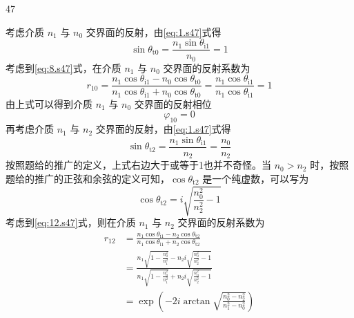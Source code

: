 \begin{solution}{47}
\begin{subsolution}
        考虑介质 $n_{1}$ 与 $n_{0}$ 交界面的反射，由\eqref{eq:1.s47}式得
        \begin{equation}
            \sin\theta_{\mathrm{t}0} = \frac{n_{1}\sin\theta_{\mathrm{i}1}}{n_{0}} = 1
            \label{eq:8.s47}
        \end{equation}
        考虑到\eqref{eq:8.s47}式，在介质 $n_{1}$ 与 $n_{0}$ 交界面的反射系数为
        \begin{equation}
            r_{10} = \frac{n_{1}\cos\theta_{\mathrm{i}1} - n_{0}\cos\theta_{\mathrm{t}0}}{n_{1}\cos\theta_{\mathrm{i}1} + n_{0}\cos\theta_{\mathrm{t}0}} = \frac{n_{1}\cos\theta_{\mathrm{i}1}}{n_{1}\cos\theta_{\mathrm{i}1}} = 1
            \label{eq:9.s47}
        \end{equation}
        由上式可以得到介质 $n_{1}$ 与 $n_{0}$ 交界面的反射相位
        \begin{equation}
            \varphi_{10} = 0
            \label{eq:10.s47}
        \end{equation}
        再考虑介质 $n_{1}$ 与 $n_{2}$ 交界面的反射，由\eqref{eq:1.s47}式得
        \begin{equation}
            \sin\theta_{\mathrm{t}2} = \frac{n_{1}\sin\theta_{\mathrm{i}1}}{n_{2}} = \frac{n_{0}}{n_{2}}
            \label{eq:11.s47}
        \end{equation}
        按照题给的推广的定义，上式右边大于或等于1也并不奇怪。当 $n_{0} > n_{2}$ 时，按照题给的推广的正弦和余弦的定义可知，$\cos\theta_{\mathrm{t}2}$ 是一个纯虚数，可以写为
        \begin{equation}
            \cos\theta_{\mathrm{t}2} = i\sqrt{\frac{n_{0}^{2}}{n_{2}^{2}} - 1}
            \label{eq:12.s47}
        \end{equation}
        考虑到\eqref{eq:12.s47}式，则在介质 $n_{1}$ 与 $n_{2}$ 交界面的反射系数为
        \begin{equation}
            \begin{aligned}
                r_{12} &= \frac{n_{1}\cos\theta_{\mathrm{i}1} - n_{2}\cos\theta_{\mathrm{t}2}}{n_{1}\cos\theta_{\mathrm{i}1} + n_{2}\cos\theta_{\mathrm{t}2}} \\
                &= \frac{n_{1}\sqrt{1 - \frac{n_{0}^{2}}{n_{1}^{2}}} - n_{2}i\sqrt{\frac{n_{0}^{2}}{n_{2}^{2}} - 1}}{n_{1}\sqrt{1 - \frac{n_{0}^{2}}{n_{1}^{2}}} + n_{2}i\sqrt{\frac{n_{0}^{2}}{n_{2}^{2}} - 1}} \\
                &= \exp\left(-2i\arctan\sqrt{\frac{n_{0}^{2} - n_{2}^{2}}{n_{1}^{2} - n_{0}^{2}}}\right)
            \end{aligned}

\end{equation}
\end{subsolution}
\end{solution}
